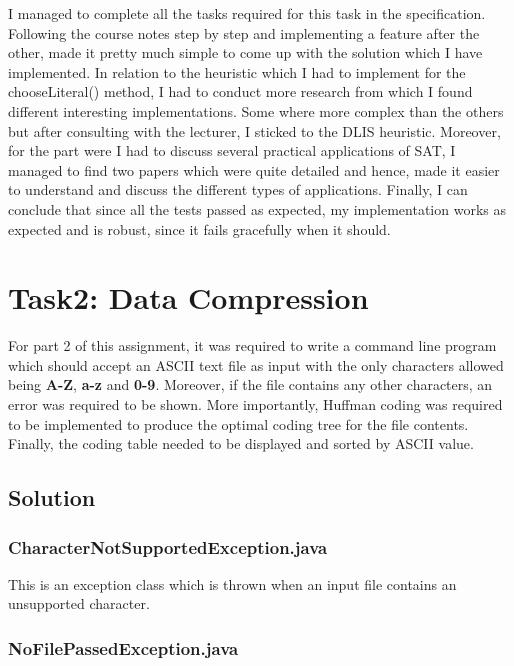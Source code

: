 \documentclass{article}
\begin{document}
		I managed to complete all the tasks required for this task in the specification. Following the course notes step by step and implementing a feature after the other, made it pretty much simple to come up with the solution which I have implemented. In relation to the heuristic which I had to implement for the chooseLiteral() method, I had to conduct more research from which I found different interesting implementations. Some where more complex than the others but after consulting with the lecturer, I sticked to the DLIS heuristic. Moreover, for the part were I had to discuss several practical applications of SAT, I managed to find two papers which were quite detailed and hence, made it easier to understand and discuss the different types of applications. Finally, I can conclude that since all the tests passed as expected, my implementation works as expected and is robust, since it fails gracefully when it should.

\pagebreak


		\section{Task2: Data	Compression}
		
		For part 2 of this assignment, it was required to write a command line program which should accept an ASCII text file as input with the only characters allowed being \textbf{A-Z}, \textbf{a-z} and \textbf{0-9}. Moreover, if the file contains any other characters, an error was required to be shown. More importantly, Huffman coding was required to be implemented to produce the optimal coding tree for the file contents. Finally, the coding table needed to be displayed and sorted by ASCII value. 
		
		\subsection{Solution}
		
		\subsubsection{CharacterNotSupportedException.java}
		
		This is an exception class which is thrown when an input file contains an unsupported character.
		
		\subsubsection{NoFilePassedException.java}
		
\end{document}

